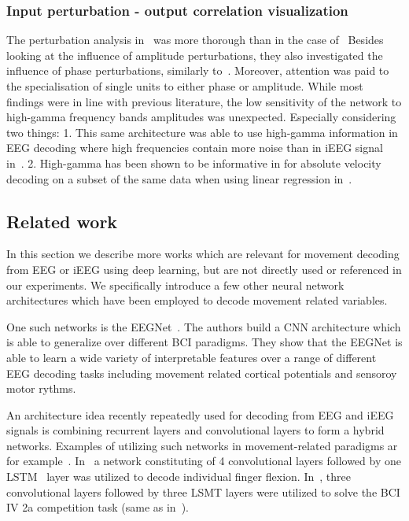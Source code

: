 \subsubsection{Input perturbation - output correlation visualization}
The perturbation analysis in~\cite{Hammer-2021} was more thorough than in the case of~\cite{schirrmeister-deep-2017}
Besides looking at the influence of amplitude perturbations, they also investigated the influence of phase perturbations, similarly to~\cite{hartmann-hierarchical-2018}.
Moreover, attention was paid to the specialisation of single units to either phase or amplitude.
While most findings were in line with previous literature, the low sensitivity of the network to high-gamma frequency bands amplitudes was unexpected.
Especially considering two things: 
1. This same architecture was able to use high-gamma information in EEG decoding where high frequencies contain more noise than in iEEG signal in~\cite{schirrmeister-deep-2017}.
2. High-gamma has been shown to be informative in for absolute velocity decoding on a subset of the same data when using linear regression in~\cite{hammer-predominance-2016}.


\subsection{Related work}
In this section we describe more works which are relevant for movement decoding from EEG or iEEG using deep learning, but are not directly used or referenced in our experiments.
We specifically introduce a few other neural network architectures which have been employed to decode movement related variables.

One such networks is the EEGNet~\cite{eeg-net}.
The authors build a CNN architecture which is able to generalize over different BCI paradigms.
They show that the EEGNet is able to learn a wide variety of interpretable features over a range of different EEG decoding tasks including movement related cortical potentials and sensoroy motor rythms.

An architecture idea recently repeatedly used for decoding from EEG and iEEG signals is combining recurrent layers and convolutional layers to form a hybrid networks.
Examples of utilizing such networks in movement-related paradigms ar for example~\cite{xie-cnn-lstm-finger-movement, Zhang-2019}.
In~\cite{xie-cnn-lstm-finger-movement} a network constituting of 4 convolutional layers followed by one LSTM~\cite{lstm-paper} layer was utilized to decode individual finger flexion.
In~\cite{Zhang-2019}, three convolutional layers followed by three LSMT layers were utilized to solve the BCI IV 2a competition task (same as in~\cite{schirrmeister-deep-2017}).


